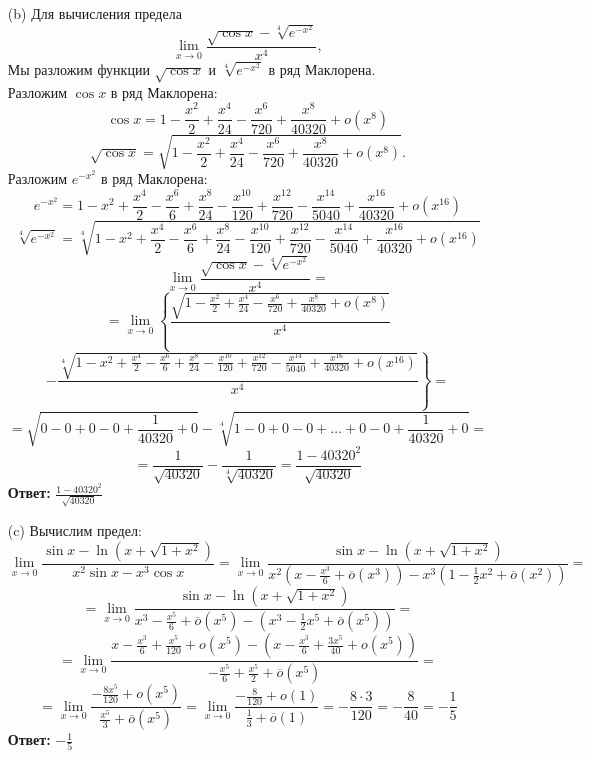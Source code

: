 \documentclass[a4paper]{article}
\renewcommand{\f}[2]{\frac{#1}{#2}}
\newcommand{\lm}[1]{\underset{#1}{\lim}}
\newcommand{\oo}{\overline{o}}
\begin{document}
\begin{enumerate}
\begin{enumerate}
        \item[(b)]Для вычисления предела 
        $$
        \lim_{x \rightarrow 0} \frac{\sqrt{\cos x} - \sqrt[4]{e^{-x^2}}}{x^4},
        $$
        Мы разложим функции $ \sqrt{\cos x} $ и $ \sqrt[4]{e^{-x^2}} $ в ряд Маклорена.\\
        Разложим $ \cos x $ в ряд Маклорена:
        $$
        \cos x = 1 - \frac{x^2}{2} + \frac{x^4}{24} - \frac{x^6}{720} + \frac{x^8}{40320} + o(x^8)
        $$
        $$
        \sqrt{\cos x} = \sqrt{1 - \frac{x^2}{2} + \frac{x^4}{24} - \frac{x^6}{720} + \frac{x^8}{40320} + o(x^8)}.
        $$
        Разложим $ e^{-x^2}$ в ряд Маклорена:
        $$
        e^{-x^2} = 1 - x^2 + \frac{x^4}{2} - \frac{x^6}{6} + \frac{x^8}{24} - \frac{x^{10}}{120} + \frac{x^{12}}{720} - \frac{x^{14}}{5040} + \frac{x^{16}}{40320} + o(x^{16})
        $$
        $$
        \sqrt[4]{e^{-x^2}} = \sqrt[4]{1 - x^2 + \frac{x^4}{2} - \frac{x^6}{6} + \frac{x^8}{24} - \frac{x^{10}}{120} + \frac{x^{12}}{720} - \frac{x^{14}}{5040} + \frac{x^{16}}{40320} + o(x^{16})}
        $$
        $$
        \lim_{x \rightarrow 0} \frac{\sqrt{\cos x} - \sqrt[4]{e^{-x^2}}}{x^4}=
        $$
        \small
        $$
        =\lim_{x \rightarrow 0}\left\{ \f{\sqrt{1 - \frac{x^2}{2} + \frac{x^4}{24} - \frac{x^6}{720} + \frac{x^8}{40320} + o(x^8)}}{x^4}\right.
        $$
        $$
        \left.-\f{\sqrt[4]{1 - x^2 + \frac{x^4}{2} - \frac{x^6}{6} + \frac{x^8}{24} - \frac{x^{10}}{120} + \frac{x^{12}}{720} - \frac{x^{14}}{5040} + \frac{x^{16}}{40320} + o(x^{16})}}{x^4}\right\}=
        $$
        $$
        =\sqrt{0 - 0 + 0 - 0 + \f{1}{40320} + 0} - \sqrt[4]{1 -0 + 0 -0 +\dots +0 - 0 + \f{1}{40320} + 0} =
        $$
        $$
        =  \f{1}{\sqrt{40320}} - \f{1}{\sqrt[4]{40320}} = \f{1-40320^2}{\sqrt{40320}}
        $$
        \textbf{Ответ: }$\f{1-40320^2}{\sqrt{40320}}$\\

        \item[(c)]Вычислим предел: 
        $$
        \lim_{x \rightarrow 0} \frac{\sin x - \ln\left(x + \sqrt{1+x^2}\right)}{x^2 \sin x - x^3 \cos x}= \lm{x\to0}\f{\sin{x}- \ln(x + \sqrt{1+x^2})}{x^2(x -\f{x^3}{6} + \oo(x^3)) - x^3(1-\f{1}{2}x^2+\oo(x^2))} = 
        $$
        $$
        =\lm{x\to0}\f{\sin{x}- \ln(x + \sqrt{1+x^2})}{x^3 -\f{x^5}{6} + \oo(x^5) - (x^3-\f{1}{2}x^5+\oo(x^5))} = 
        $$
        $$
        = \lm{x\to0}\f{x - \frac{x^3}{6} + \frac{x^5}{120} + o(x^5) - (x - \frac{x^3}{6} + \frac{3x^5}{40} + o(x^5))}{ -\f{x^5}{6} + \f{x^5}{2}+\oo(x^5)} =
        $$
        $$
        =\lm{x\to0}\f{-\frac{8x^5}{120} + o(x^5)}{\f{x^5}{3}+\oo(x^5)} = \lm{x\to0}\f{-\frac{8}{120} + o(1)}{\f{1}{3}+\oo(1)} = -\f{8\cdot3}{120} = -\f{8}{40} = -\f{1}{5} 
        $$
        \textbf{Ответ:} $-\f{1}{5}$\\
    \end{enumerate}


\end{enumerate}
\end{document}
